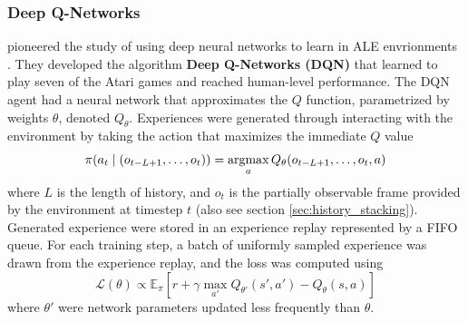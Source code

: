 \subsubsection{Deep Q-Networks}
\citeauthor{PlayingAtariDeep_Mnih.Kavukcuoglu.ea_2013} pioneered the study of using deep neural networks to learn in ALE envrionments \cite{PlayingAtariDeep_Mnih.Kavukcuoglu.ea_2013}.
They developed the algorithm \textbf{Deep Q-Networks (DQN)} that learned to play seven of the Atari games and reached human-level performance.
The DQN agent had a neural network that approximates the $Q$ function, parametrized by weights $\theta$, denoted $Q_\theta$.
Experiences were generated through interacting with the environment by taking the action that maximizes the immediate $Q$ value
\begin{align*}
    \pi(a_t \mid (o_{t - L + 1}, \dots, o_t)) = \operatorname*{argmax}_{a}{Q_{\theta}(o_{t - L + 1}, \dots, o_t, a)}
\end{align*}
where $L$ is the length of history, and $o_t$ is the partially observable frame provided by the environment at timestep $t$ (also see section \ref{sec:history_stacking}).
Generated experience were stored in an experience replay represented by a FIFO queue.
For each training step, a batch of uniformly sampled experience was drawn from the experience replay, and the loss was computed using
\begin{equation*}
    \mathcal{L}(\theta) \propto \mathbb{E}_\pi\left[r + \gamma \max _{a'} Q_{\theta'}(s', a') - Q_{\theta}(s, a) \right]
\end{equation*}
where $\theta'$ were network parameters updated less frequently than $\theta$.

